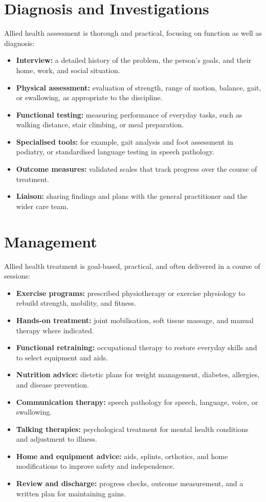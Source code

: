 \section*{Diagnosis and Investigations}
Allied health assessment is thorough and practical, focusing on function as well as diagnosis:

\begin{itemize}
    \item \textbf{Interview:} a detailed history of the problem, the person's goals, and their home, work, and social situation.
    \item \textbf{Physical assessment:} evaluation of strength, range of motion, balance, gait, or swallowing, as appropriate to the discipline.
    \item \textbf{Functional testing:} measuring performance of everyday tasks, such as walking distance, stair climbing, or meal preparation.
    \item \textbf{Specialised tools:} for example, gait analysis and foot assessment in podiatry, or standardised language testing in speech pathology.
    \item \textbf{Outcome measures:} validated scales that track progress over the course of treatment.
    \item \textbf{Liaison:} sharing findings and plans with the general practitioner and the wider care team.
\end{itemize}

\section*{Management}
Allied health treatment is goal-based, practical, and often delivered in a course of sessions:

\begin{itemize}
    \item \textbf{Exercise programs:} prescribed physiotherapy or exercise physiology to rebuild strength, mobility, and fitness.
    \item \textbf{Hands-on treatment:} joint mobilisation, soft tissue massage, and manual therapy where indicated.
    \item \textbf{Functional retraining:} occupational therapy to restore everyday skills and to select equipment and aids.
    \item \textbf{Nutrition advice:} dietetic plans for weight management, diabetes, allergies, and disease prevention.
    \item \textbf{Communication therapy:} speech pathology for speech, language, voice, or swallowing.
    \item \textbf{Talking therapies:} psychological treatment for mental health conditions and adjustment to illness.
    \item \textbf{Home and equipment advice:} aids, splints, orthotics, and home modifications to improve safety and independence.
    \item \textbf{Review and discharge:} progress checks, outcome measurement, and a written plan for maintaining gains.
\end{itemize}

